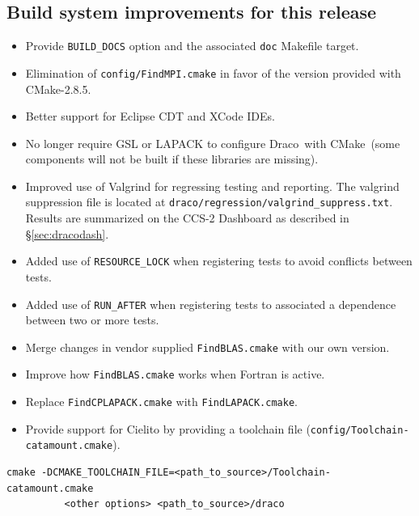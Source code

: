 \documentclass[note]{ResearchNote_pdf}
\newcommand{\draco}{Draco}
\newcommand{\cmake}{\textsf{CMake}}
\begin{document}
\subsection{Build system improvements for this release}

\begin{itemize}
\item Provide \texttt{BUILD\_DOCS} option and the associated
  \texttt{doc} Makefile target.
\item Elimination of \texttt{config/FindMPI.cmake} in favor of the version provided
  with \cmake-2.8.5.
\item Better support for \textsf{Eclipse CDT} and \textsf{XCode} IDEs.
\item No longer require \textsf{GSL} or \textsf{LAPACK} to configure \draco\ with \cmake\ (some
  components will not be built if these libraries are missing).
\item Improved use of \textsf{Valgrind} for regressing testing and
  reporting.  The valgrind suppression file is located at
    \texttt{draco/regression/valgrind\_suppress.txt}.  Results are
    summarized on the CCS-2 Dashboard as described in
    \S\ref{sec:dracodash}.
\item Added use of \texttt{RESOURCE\_LOCK} when registering tests to avoid
  conflicts between tests.
\item Added use of \texttt{RUN\_AFTER} when registering tests to associated
  a dependence between two or more tests.
\item Merge changes in vendor supplied \texttt{FindBLAS.cmake} with our own version.
\item Improve how \texttt{FindBLAS.cmake} works when Fortran is active.
\item Replace \texttt{FindCPLAPACK.cmake} with \texttt{FindLAPACK.cmake}.
\item Provide support for \textsf{Cielito} by providing a toolchain file
  (\texttt{config/Toolchain-catamount.cmake}).

\end{itemize}

\begin{lstlisting}[xleftmargin=0.50in, xrightmargin=0.50in]
cmake -DCMAKE_TOOLCHAIN_FILE=<path_to_source>/Toolchain-catamount.cmake
          <other options> <path_to_source>/draco
\end{lstlisting}
\end{document}

